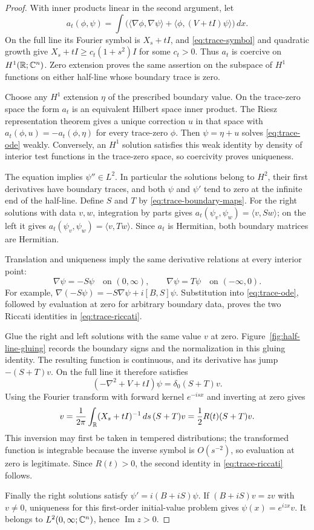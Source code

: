 \begin{proof}
With inner products linear in the second argument, let
\[
 a_t(\phi,\psi)=\int
    \bigl(\langle\nabla\phi,\nabla\psi\rangle
       +\langle\phi,(V+tI)\psi\rangle\bigr)\,dx.
\]
On the full line its Fourier symbol is $X_s+tI$, and
\eqref{eq:trace-symbol} and quadratic growth give
$X_s+tI\geq c_t(1+s^2)I$ for some $c_t>0$.
Thus $a_t$ is coercive on $H^1(\mathbb R;\mathbb C^n)$.  Zero extension proves
the same assertion on the subspace of $H^1$ functions on either
half-line whose boundary trace is zero.

Choose any $H^1$ extension $\eta$ of the prescribed boundary value.
On the trace-zero space the form $a_t$ is an equivalent Hilbert
space inner product.  The Riesz representation theorem gives a
unique correction $u$ in that space with
$a_t(\phi,u)=-a_t(\phi,\eta)$ for every trace-zero $\phi$.
Then $\psi=\eta+u$ solves \eqref{eq:trace-ode} weakly.
Conversely, an $H^1$ solution satisfies this weak identity by
density of interior test functions in the trace-zero space, so
coercivity proves uniqueness.

The equation implies $\psi''\in L^2$.  In particular the solutions
belong to $H^2$, their first derivatives have boundary traces, and
both $\psi$ and $\psi'$ tend to zero at the infinite end of the
half-line.  Define $S$ and $T$ by \eqref{eq:trace-boundary-maps}.
For the right solutions with data $v,w$, integration by parts gives
$a_t(\psi_v,\psi_w)=\langle v,Sw\rangle$; on the left it gives
$a_t(\psi_v,\psi_w)=\langle v,Tw\rangle$.  Since $a_t$ is Hermitian,
both boundary matrices are Hermitian.

Translation and uniqueness imply the same derivative relations
at every interior point:
\[
 \nabla\psi=-S\psi\quad\text{on }(0,\infty),\qquad
 \nabla\psi=T\psi\quad\text{on }(-\infty,0).
\]
For example,
$\nabla(-S\psi)=-S\nabla\psi+i[B,S]\psi$.
Substitution into \eqref{eq:trace-ode}, followed by evaluation at
zero for arbitrary boundary data, proves the two Riccati identities
in \eqref{eq:trace-riccati}.

Glue the right and left solutions with the same value $v$ at zero.
Figure~\ref{fig:half-line-gluing} records the boundary signs and
the normalization in this gluing identity.
The resulting function is continuous, and its derivative has jump
$-(S+T)v$.  On the full line it therefore satisfies
\[
 (-\nabla^2+V+tI)\psi=\delta_0(S+T)v.
\]
Using the Fourier transform with forward kernel $e^{-isx}$ and
inverting at zero gives
\[
 v=\frac1{2\pi}\int_\mathbb R(X_s+tI)^{-1}\,ds\,(S+T)v
   =\frac12R(t)(S+T)v.
\]
This inversion may first be taken in tempered distributions;
the transformed function is integrable because the inverse symbol
is $O(s^{-2})$, so evaluation at zero is legitimate.  Since
$R(t)>0$, the second identity in \eqref{eq:trace-riccati} follows.

Finally the right solutions satisfy $\psi'=i(B+iS)\psi$.
If $(B+iS)v=zv$ with $v\ne0$, uniqueness for this first-order
initial-value problem gives $\psi(x)=e^{izx}v$.
It belongs to $L^2(0,\infty;\mathbb C^n)$, hence
$\operatorname{Im}z>0$.
\end{proof}

